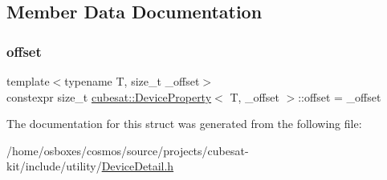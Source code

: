 \subsection{Member Data Documentation}
\mbox{\label{structcubesat_1_1DeviceProperty_a7933ea00a94fae2ada82baf975d8e557}} 
\subsubsection{\texorpdfstring{offset}{offset}}
{\footnotesize\ttfamily template$<$typename T, size\+\_\+t \+\_\+offset$>$ \\
constexpr size\+\_\+t \hyperlink{structcubesat_1_1DeviceProperty}{cubesat\+::\+Device\+Property}$<$ T, \+\_\+offset $>$\+::offset = \+\_\+offset\hspace{0.3cm}{\ttfamily [static]}}



The documentation for this struct was generated from the following file\+:\begin{DoxyCompactItemize}
\item 
/home/osboxes/cosmos/source/projects/cubesat-\/kit/include/utility/\hyperlink{DeviceDetail_8h}{Device\+Detail.\+h}\end{DoxyCompactItemize}
